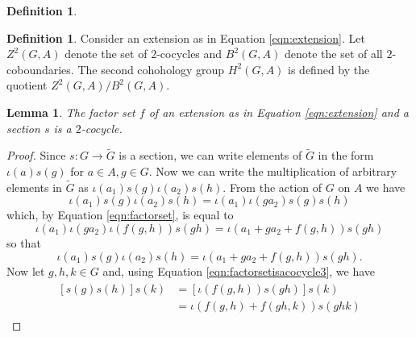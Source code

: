 \documentclass{dcthesis}
\newcommand{\defi}[1]{\textsf{#1}}
\newcommand{\mm}[1]{{\color{blue} \sf MM: [#1]}}
\newcommand{\wt}[1]{\widetilde{#1}}
\numberwithin{equation}{section}
\newtheorem{lemma}[equation]{Lemma}
\theoremstyle{definition}
\newtheorem{definition}[equation]{Definition}
\theoremstyle{remark}
\begin{document}
{{\begin{definition}
    \end{definition}
    \begin{definition}
      \label{def:h2}
      Consider an extension as in Equation \ref{eqn:extension}.
      Let $Z^2(G,A)$ denote the set
      of $2$-cocycles and $B^2(G,A)$
      denote the set of all $2$-coboundaries.
      The \defi{second cohohology group} $H^2(G,A)$
      is defined by the
      quotient $Z^2(G,A)/B^2(G,A)$.
    \end{definition}
    \begin{lemma}
      \label{lem:factorsetisacocycle}
      The factor set $f$ of an extension
      as in Equation \ref{eqn:extension}
      and a section $s$ is a $2$-cocycle.
    \end{lemma}
    \begin{proof}
      Since $s\colon G\to\wt{G}$ is a section,
      we can write elements of $\wt{G}$ in the form
      $\iota(a)s(g)$ for $a\in A, g\in G$.
      Now we can write the multiplication of arbitrary elements in $\wt{G}$ as
      $\iota(a_1)s(g)\iota(a_2)s(h)$.
      From the action of $G$ on $A$ we have
      \begin{equation}
        \label{eqn:factorsetisacocycle1}
        \iota(a_1)s(g)\iota(a_2)s(h) = \iota(a_1)\iota(ga_2)s(g)s(h)
      \end{equation}
      which, by Equation \ref{eqn:factorset},
      is equal to
      \begin{equation}
        \label{eqn:factorsetisacocycle2}
        \iota(a_1)\iota(ga_2)\iota(f(g,h))s(gh)
        =\iota(a_1+ga_2+f(g,h))s(gh)
      \end{equation}
      so that
      \begin{equation}
        \label{eqn:factorsetisacocycle3}
        \iota(a_1)s(g)\iota(a_2)s(h)
        =\iota(a_1+ga_2+f(g,h))s(gh).
      \end{equation}
      Now let $g,h,k\in G$ and,
      using Equation \ref{eqn:factorsetisacocycle3},
      we have
      \begin{align}
        \label{eqn:associative1}
        \begin{split}
          [s(g)s(h)]s(k) &= [\iota(f(g,h))s(gh)]s(k)\\
                         &= \iota(f(g,h)+f(gh,k))s(ghk)

\end{split}
\end{align}
\end{proof}}}
\end{document}
